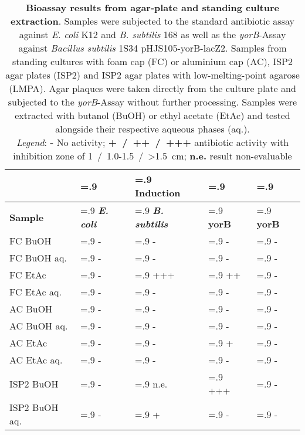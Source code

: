 \begin{table}[htbp]
    \caption[Bioassay results from agar-plate and standing culture extraction]{%
    	\textbf{Bioassay results from agar-plate and standing culture extraction}.
        Samples were subjected to the standard antibiotic assay against \textit{E. coli} K12 and \textit{B. subtilis} 168 as well as the \emph{yorB}-Assay against \textit{Bacillus subtilis} 1S34 pHJS105-yorB-lacZ2.
        Samples from standing cultures with foam cap (FC) or aluminium cap (AC), ISP2 agar plates (ISP2) and ISP2 agar plates with low-melting-point agarose (LMPA).
        Agar plaques were taken directly from the culture plate and subjected to the \emph{yorB}-Assay without further processing.
        Samples were extracted with butanol (BuOH) or ethyl acetate (EtAc) and tested alongside their respective aqueous phases (aq.).\\
        \emph{Legend}: \textbf{-} No activity; \textbf{+~/~++~/~+++} antibiotic activity with inhibition zone of 1~/~1.0-1.5~/~>1.5~cm; \textbf{n.e.} result non-evaluable}
    \label{tab:yorB_assay_results}
    \centering
    \begin{tabularx}{\textwidth}{>{\hsize=1.4\hsize}X>{\hsize=.9\hsize}X>{\hsize=.9\hsize}X>{\hsize=.9\hsize}X>{\hsize=.9\hsize}X}
        \toprule
        & \multicolumn{3}{c}{Antibacterial} & Induction \\
        \cline{2-4}
        \textbf{Sample} & \textbf{\textit{E. coli}}     & \textbf{\textit{B. subtilis}}  & \textbf{yorB}  & \textbf{yorB}    \\
        \midrule
        FC BuOH         & -     & -     & -     & -    \\
        FC BuOH aq.     & -     & -     & -     & -    \\
        FC EtAc         & -     & +++   & ++    & -    \\
        FC EtAc aq.     & -     & -     & -     & -    \\
        AC BuOH         & -     & -     & -     & -    \\
        AC BuOH aq.     & -     & -     & -     & -    \\
        AC EtAc         & -     & -     & +     & -    \\
        AC EtAc aq.     & -     & -     & -     & -    \\
        \midrule
        ISP2 BuOH       & -     & n.e.  & +++   & -    \\
        ISP2 BuOH aq.   & -     & +     & -     & -    \\

\end{tabularx}
\end{table}
